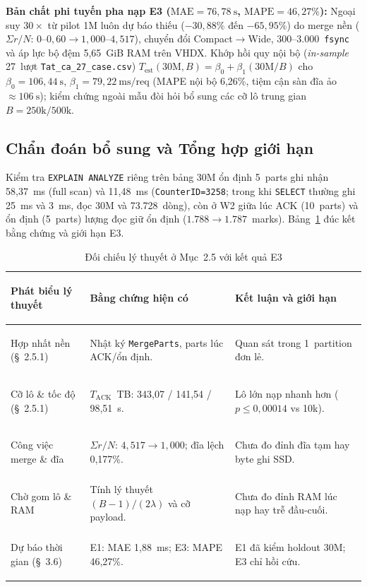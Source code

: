 \documentclass[13pt,a4paper]{report}
\begin{document}
\vspace{0.15cm}
\noindent\textbf{Bản chất phi tuyến pha nạp E3 ($\text{MAE} = 76{,}78~\text{s}$, $\text{MAPE} = 46{,}27\%$):} Ngoại suy $30{\times}$ từ pilot 1M luôn dự báo thiếu ($-30{,}88\%$ đến $-65{,}95\%$) do merge nền ($\Sigma r/N$: $0\text{--}0{,}60 \rightarrow 1{,}000\text{--}4{,}517$), chuyển đổi Compact$\rightarrow$Wide, 300--3.000~\texttt{fsync} và áp lực bộ đệm 5,65~GiB RAM trên VHDX. Khớp hồi quy nội bộ (\textit{in-sample} 27~lượt \mbox{\texttt{Tat\_ca\_27\_case.csv}}) $T_{\text{est}}(30\text{M}, B) = \beta_0 + \beta_1 (30\text{M}/B)$ cho $\beta_0 = 106{,}44~\text{s}$, $\beta_1 = 79{,}22~\text{ms/req}$ (MAPE nội bộ 6,26\%, tiệm cận sàn đĩa ảo $\approx 106~\text{s}$); kiểm chứng ngoài mẫu đòi hỏi bổ sung các cỡ lô trung gian $B = 250\text{k}/500\text{k}$.

\subsection{Chẩn đoán bổ sung và Tổng hợp giới hạn}
Kiểm tra \texttt{EXPLAIN ANALYZE} riêng trên bảng 30M ổn định 5~parts ghi nhận 58,37~ms (full scan) và 11,48~ms (\texttt{CounterID=3258}; trong khi \texttt{SELECT} thường ghi 25~ms và 3~ms, đọc 30M và 73.728~dòng), còn ở W2 giữa lúc ACK (10~parts) và ổn định (5~parts) lượng đọc giữ ổn định ($1.788 \rightarrow 1.787$~marks). Bảng~\ref{tab:theory_vs_e3} đúc kết bằng chứng và giới hạn E3.

\begin{table}[!htb]
\centering
\scriptsize
\renewcommand{\arraystretch}{1.08}
\caption{Đối chiếu lý thuyết ở Mục~2.5 với kết quả E3}
\label{tab:theory_vs_e3}
\begin{tabularx}{\textwidth}{>{\bfseries\raggedright\arraybackslash}p{3.6cm} >{\raggedright\arraybackslash}p{4.8cm} >{\raggedright\arraybackslash}X}
\toprule
\textbf{Phát biểu lý thuyết} & \textbf{Bằng chứng hiện có} & \textbf{Kết luận và giới hạn} \\
\midrule
Hợp nhất nền (\S~2.5.1) & Nhật ký \texttt{MergeParts}, parts lúc ACK/ổn định. & Quan sát trong 1~partition đơn lẻ. \\
Cỡ lô \& tốc độ (\S~2.5.1) & $T_{\text{ACK}}$~TB: 343,07 / 141,54 / 98,51~s. & Lô lớn nạp nhanh hơn ($p \le 0{,}00014$ vs 10k). \\
Công việc merge \& đĩa & $\Sigma r/N$: $4{,}517 \rightarrow 1{,}000$; đĩa lệch 0,177\%. & Chưa đo đỉnh đĩa tạm hay byte ghi SSD. \\
Chờ gom lô \& RAM & Tính lý thuyết $(B-1)/(2\lambda)$ và cỡ payload. & Chưa đo đỉnh RAM lúc nạp hay trễ đầu-cuối. \\
Dự báo thời gian (\S~3.6) & E1: MAE 1,88~ms; E3: MAPE 46,27\%. & E1 đã kiểm holdout 30M; E3 chỉ hồi cứu. \\
\bottomrule
\end{tabularx}
\end{table}
\end{document}
